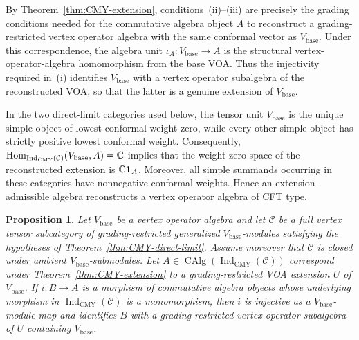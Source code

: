 \documentclass[10pt,a4paper]{amsart}
\numberwithin{equation}{section} \newtheorem{thm}{Theorem}[section] \newtheorem{lem}[thm]{Lemma} \newtheorem{ex}[thm]{Example} \newtheorem{prop}[thm]{Proposition} \newtheorem{cor}[thm]{Corollary} \newtheorem{defi}[thm]{Definition} \newtheorem{rmk}[thm]{Remark} \newtheorem{notation}[thm]{Notation}
\newcommand{\one}{\mathbf{1}}
\newcommand{\Hom}{\operatorname{Hom}}
\newcommand{\CAlg}{\operatorname{CAlg}}
\newcommand{\IndCMY}{\operatorname{Ind}_{\mathrm{CMY}}}
\begin{document}
By Theorem~\ref{thm:CMY-extension}, conditions~(ii)--(iii) are precisely the grading conditions needed for the commutative algebra object $A$ to reconstruct a grading-restricted vertex operator algebra with the same conformal vector as $V_{\mathrm{base}}$. Under this correspondence, the algebra unit $\iota_A:V_{\mathrm{base}}\to A$ is the structural vertex-operator-algebra homomorphism from the base VOA. Thus the injectivity required in~(i) identifies $V_{\mathrm{base}}$ with a vertex operator subalgebra of the reconstructed VOA, so that the latter is a genuine extension of $V_{\mathrm{base}}$.

In the two direct-limit categories used below, the tensor unit $V_{\mathrm{base}}$ is the unique simple object of lowest conformal weight zero, while every other simple object has strictly positive lowest conformal weight. Consequently, $\Hom_{\IndCMY(\mathcal C)}(V_{\mathrm{base}},A)=\C$ implies that the weight-zero space of the reconstructed extension is $\C\one_A$. Moreover, all simple summands occurring in these categories have nonnegative conformal weights. Hence an extension-admissible algebra reconstructs a vertex operator algebra of CFT type.

\begin{prop}\label{prop:subalgebra-interface}
Let $V_{\mathrm{base}}$ be a vertex operator algebra and let $\mathcal C$ be a full vertex tensor subcategory of grading-restricted generalized $V_{\mathrm{base}}$-modules satisfying the hypotheses of Theorem~\ref{thm:CMY-direct-limit}. Assume moreover that $\mathcal C$ is closed under ambient $V_{\mathrm{base}}$-submodules. Let $A\in\CAlg(\IndCMY(\mathcal C))$ correspond under Theorem~\ref{thm:CMY-extension} to a grading-restricted VOA extension $U$ of $V_{\mathrm{base}}$. If $i:B\to A$ is a morphism of commutative algebra objects whose underlying morphism in $\IndCMY(\mathcal C)$ is a monomorphism, then $i$ is injective as a $V_{\mathrm{base}}$-module map and identifies $B$ with a grading-restricted vertex operator subalgebra of $U$ containing $V_{\mathrm{base}}$.
\end{prop}
\end{document}
